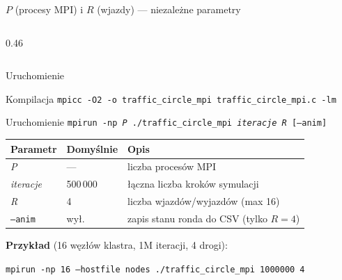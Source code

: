 \documentclass[aspectratio=169]{beamer}
\begin{document}
\begin{frame}{$P$ (procesy MPI) i $R$ (wjazdy) — niezależne parametry}
\begin{columns}
\begin{column}{0.46\textwidth}
      \bigskip
    \end{column}
  \end{columns}
\end{frame}

\begin{frame}{Uruchomienie}
  \begin{block}{Kompilacja}
    \texttt{mpicc -O2 -o traffic\_circle\_mpi traffic\_circle\_mpi.c -lm}
  \end{block}

  \begin{block}{Uruchomienie}
    \texttt{mpirun -np \textit{P} ./traffic\_circle\_mpi \textit{iteracje} \textit{R} [\texttt{--anim}]}
  \end{block}

  \bigskip
  \begin{center}
    \begin{tabular}{lll}
      \hline
      Parametr & Domyślnie & Opis \\
      \hline
      \textit{P}         & —        & liczba procesów MPI \\
      \textit{iteracje}  & 500\,000 & łączna liczba kroków symulacji \\
      \textit{R}         & 4        & liczba wjazdów/wyjazdów (max 16) \\
      \texttt{--anim}    & wył.     & zapis stanu ronda do CSV (tylko $R=4$) \\
      \hline
    \end{tabular}
  \end{center}

  \bigskip
  \textbf{Przykład} (16 węzłów klastra, 1M iteracji, 4 drogi):
  \begin{center}
    \texttt{mpirun -np 16 --hostfile nodes ./traffic\_circle\_mpi 1000000 4}
  \end{center}
\end{frame}
\end{document}
